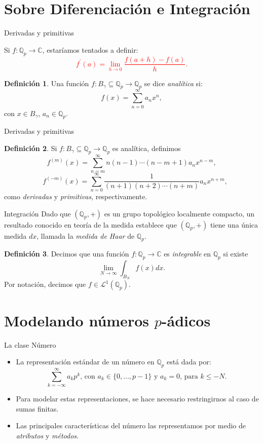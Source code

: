 \documentclass{beamer}
\theoremstyle{definition}
\numberwithin{equation}{section}
\newcommand{\marine}[1]{\textcolor{defColor}{#1}}
\newtheorem{df}{\marine{Definición}}
\newcommand{\tit}[1]{\textit{#1}}
\newcommand{\red}[1]{\textcolor{red}{#1}}
\renewcommand{\leq}{\leqslant}
\newcommand{\C}{\mathbb{C}}
\newcommand{\Qp}{\mathbb{Q}_p}
\begin{document}
\section{Sobre Diferenciación e Integración}

\begin{frame}{Derivadas y primitivas}
	
		Si $f\colon\Qp\to\C$, estaríamos tentados a definir: \red{$$f^{\prime} (a)=\lim\limits_{h\to 0}\frac{f (a+h)-f (a)}{h}.$$}
	\begin{df}
		Una función $f\colon B_\gamma\subseteq\Qp\to\Qp$ se dice \tit{analítica} si:
		$$f (x)=\sum_{n=0}^{\infty}a_nx^n,$$
		con $x\in B_\gamma$, $a_n\in\Qp$. 
	\end{df}
	
\end{frame}
\begin{frame}{Derivadas y primitivas}
	\begin{df} Si $f\colon B_\gamma\subseteq\Qp\to\Qp$ es analítica, definimos
		\[
		f^{ (m)} (x)=\sum_{n=m}^{\infty} n (n-1) \cdots (n-m+1) a_{n} x^{n-m},
		\]
		\[
		\quad f^{ (-m)} (x)=\sum_{n=0}^{\infty} \frac{1}{ (n+1) (n+2) \cdots (n+m)} a_{n} x^{n+m},
		\] 
		como \textit{derivadas} y \textit{primitivas}, respectivamente.
	\end{df}
\end{frame}

\begin{frame}{Integración}
	Dado que $ (\Qp, +)$ es un grupo topológico localmente compacto, un resultado conocido en teoría de la medida establece que $ (\Qp, +)$ tiene
	una única medida $dx$, llamada la \textit{medida de Haar}	de $\Qp$.
	\begin{df}
		Decimos que una función $f\colon\Qp\to\C$  es \textit{integrable} en $\Qp$ si existe 
		$$\lim _{N \rightarrow \infty} \int_{B_{N}} f (x) dx.$$
		Por notación, decimos que $f\in\mathcal{L}^1(\Qp)$.
		
		
	\end{df}
\end{frame}
\fi

\section{Modelando números $p$-ádicos}
\begin{frame}{La clase Número}
	\begin{itemize}[<+- | alert@+>]
		\item La representación estándar de un número en $\Qp$ está dada por:
		\begin{equation}
		\sum_{k=-\infty}^{\infty} a_{k} p^{k}\text{, con $a_k\in\{0,\dots,p-1\}$ y $a_k=0$, para $k\leq - N$. 
		}	\label{num_rep}
		\end{equation}
		\item Para modelar estas representaciones, se hace necesario restringirnos al caso de sumas finitas.
		\item Las principales características del número las representamos por medio de \tit{atributos} y \tit{métodos}.
	\end{itemize}
\end{frame}
\end{document}
